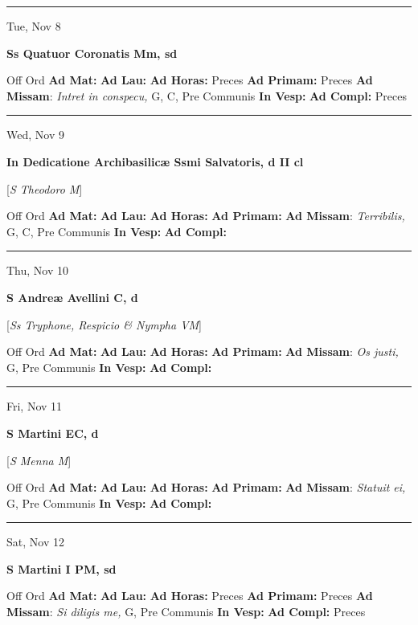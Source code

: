 \documentclass[letterpaper, 10pt]{article}
\begin{document}
\hrule
\begin{center}
Tue, Nov 8
\end{center}\textbf{ \large Ss Quatuor Coronatis Mm, \textnormal{\normalsize sd}}
\begin{justify}
Off Ord
\textbf{Ad Mat: }
\textbf{Ad Lau: }
\textbf{Ad Horas: }Preces
\textbf{Ad Primam: }Preces
\textbf{Ad Missam}: \textit{Intret in conspecu,} G, C, Pre Communis
\textbf{In Vesp: }
\textbf{Ad Compl: }Preces\end{justify}



\hrule
\begin{center}
Wed, Nov 9
\end{center}\textbf{ \large In Dedicatione Archibasilicæ Ssmi Salvatoris, \textnormal{\normalsize d II cl}}

[\textit{S Theodoro M}]
\begin{justify}
Off Ord
\textbf{Ad Mat: }
\textbf{Ad Lau: }
\textbf{Ad Horas: }
\textbf{Ad Primam: }
\textbf{Ad Missam}: \textit{Terribilis,} G, C, Pre Communis
\textbf{In Vesp: }
\textbf{Ad Compl: }\end{justify}



\hrule
\begin{center}
Thu, Nov 10
\end{center}\textbf{ \large S Andreæ Avellini C, \textnormal{\normalsize d}}

[\textit{Ss Tryphone, Respicio \& Nympha VM}]
\begin{justify}
Off Ord
\textbf{Ad Mat: }
\textbf{Ad Lau: }
\textbf{Ad Horas: }
\textbf{Ad Primam: }
\textbf{Ad Missam}: \textit{Os justi,} G, Pre Communis
\textbf{In Vesp: }
\textbf{Ad Compl: }\end{justify}



\hrule
\begin{center}
Fri, Nov 11
\end{center}\textbf{ \large S Martini  EC, \textnormal{\normalsize d}}

[\textit{S Menna M}]
\begin{justify}
Off Ord
\textbf{Ad Mat: }
\textbf{Ad Lau: }
\textbf{Ad Horas: }
\textbf{Ad Primam: }
\textbf{Ad Missam}: \textit{Statuit ei,} G, Pre Communis
\textbf{In Vesp: }
\textbf{Ad Compl: }\end{justify}



\hrule
\begin{center}
Sat, Nov 12
\end{center}\textbf{ \large S Martini I PM, \textnormal{\normalsize sd}}
\begin{justify}
Off Ord
\textbf{Ad Mat: }
\textbf{Ad Lau: }
\textbf{Ad Horas: }Preces
\textbf{Ad Primam: }Preces
\textbf{Ad Missam}: \textit{Si diligis me,} G, Pre Communis
\textbf{In Vesp: }
\textbf{Ad Compl: }Preces\end{justify}
\end{document}
